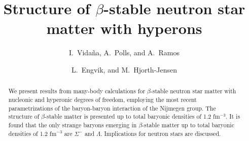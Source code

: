 



\draft



\title{Structure of $\beta$-stable neutron star 
       matter with hyperons}

\author{I.\ Vida\~na, A.\ Polls, and A.\ Ramos}

\address{Departament d'Estructura i Constituents de la Mat\`eria,
Universitat de Barcelona, E-08028 Barcelona, Spain}

\author{L.\ Engvik, and M.\  Hjorth-Jensen}

\address{Department of Physics, University of Oslo, N-0316 Oslo, Norway}

\maketitle

\begin{abstract}

We present results from many-body calculations 
for $\beta$-stable neutron star 
matter with nucleonic and
hyperonic degrees of freedom, employing the most recent parametrizations
of the baryon-baryon interaction of the Nijmegen group. 
The structure of $\beta$-stable matter is presented up to
total baryonic densities of 1.2 fm$^{-3}$. 
It is found that the only strange baryons emerging in $\beta$-stable matter 
up to total baryonic densities of 1.2 fm$^{-3}$ are $\Sigma^-$ and 
$\Lambda$.
Implications for neutron stars are discussed.    


\end{abstract}



